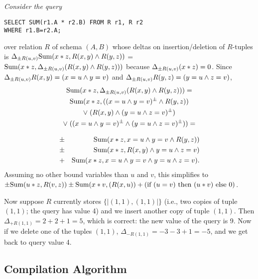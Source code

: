 \begin{example}\em
Consider the query
\begin{verbatim}
SELECT SUM(r1.A * r2.B) FROM R r1, R r2
WHERE r1.B=r2.A;
\end{verbatim}
over relation $R$ of schema $(A,B)$
whose deltas on insertion/deletion of
$R$-tuples is
$\Delta_{\pm R(u,v)} \mbox{Sum}(x*z, R(x,y) \land R(y,z))$ =
$\mbox{Sum}(x*z, \Delta_{\pm R(u,v)} (R(x,y) \land R(y,z)))$
because $\Delta_{\pm R(u,v)} (x*z) = 0$. Since
$\Delta_{\pm R(u,v)} R(x,y) = (x=u \land y=v)$ and
$\Delta_{\pm R(u,v)} R(y,z) = (y=u \land z=v)$,%
%
\begin{multline*}
\mbox{Sum}(x*z, \Delta_{\pm R(u,v)} (R(x,y) \land R(y,z))) = \\
\mbox{Sum}(x*z, ((x=u \land y=v)^\pm \land R(y,z)) \\
\lor\;
 (R(x,y) \land (y=u \land z=v)^\pm) \\
\lor\;
 ((x=u \land y=v)^\pm \land (y=u \land z=v)^\pm)) =
\end{multline*}

\vspace{-6mm}

\begin{eqnarray*}
&\pm& \mbox{Sum}(x*z, x=u \land y=v \land R(y,z)) \\
&\pm& \mbox{Sum}(x*z, R(x,y) \land y=u \land z=v) \\
&+  & \mbox{Sum}(x*z, x=u \land y=v \land y=u \land z=v).
\end{eqnarray*}
Assuming no other bound variables than $u$ and $v$,
this simplifies to
$\pm \mbox{Sum}(u*z, R(v,z))
 \pm \mbox{Sum}(x*v, (R(x,u))
 +   (\mbox{if }(u=v) \mbox{ then }(u*v)\mbox{ else }0)$.

Now suppose $R$ currently stores $\{\!| (1,1), (1,1) |\!\}$
(i.e., two copies of tuple $(1,1)$; the query has value 4)
and we insert another copy of tuple $(1,1)$.
Then $\Delta_{+R(1,1)} = 2 + 2 + 1 = 5$, which is
correct: the new value of the query is 9. Now if we delete one of the tuples
$(1,1)$,
$\Delta_{-R(1,1)} = -3 -3 +1 = -5$, and we get back to query value 4. 
\punto
\end{example}




\subsection{Compilation Algorithm}



